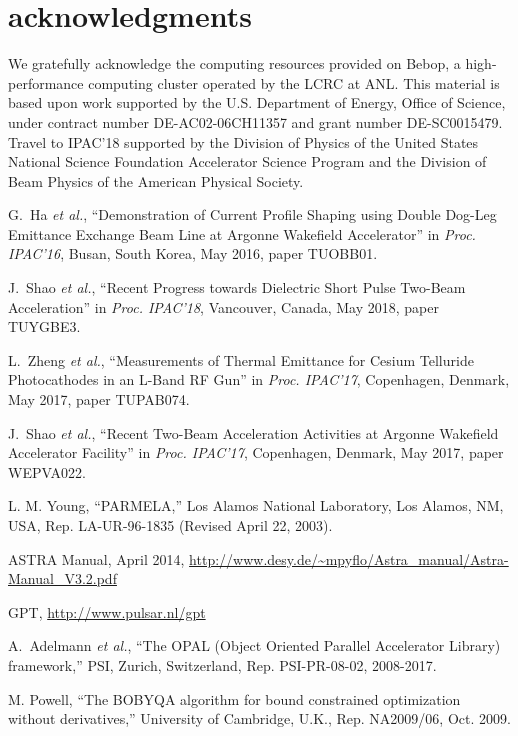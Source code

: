 \documentclass[letterpaper,  %
              ]{jacow-2_3}   %
\begin{document}
\section{acknowledgments}
We gratefully acknowledge the computing resources
provided on Bebop, a high-performance computing cluster
operated by the LCRC at ANL.
This material is based upon work supported by the 
U.S. Department of Energy, Office of Science, under 
contract number DE-AC02-06CH11357 and grant number DE-SC0015479. 
Travel to IPAC'18 supported by the Division of Physics 
of the United States National Science Foundation 
Accelerator Science Program and the Division of 
Beam Physics of the American Physical Society.

\begin{thebibliography}{99}
G.~Ha \emph{et al.}, “Demonstration of Current Profile 
Shaping using Double Dog-Leg Emittance Exchange Beam 
Line at Argonne Wakefield Accelerator”
in \textit{Proc. IPAC’16}, 
Busan, South Korea, May 2016, 
paper TUOBB01.

J.~Shao \emph{et al.}, “Recent Progress towards Dielectric Short Pulse Two-Beam Acceleration”
in \textit{Proc. IPAC’18}, 
Vancouver, Canada, May 2018, 
paper TUYGBE3.

L.~Zheng \emph{et al.}, “Measurements of Thermal Emittance 
for Cesium Telluride Photocathodes in an L-Band RF Gun”
in \textit{Proc. IPAC’17}, 
Copenhagen, Denmark, May 2017, 
paper TUPAB074.

J.~Shao \emph{et al.}, “Recent Two-Beam 
Acceleration Activities at Argonne Wakefield Accelerator Facility”
in \textit{Proc. IPAC’17}, 
Copenhagen, Denmark, May 2017, 
paper WEPVA022.

L. M. Young, “PARMELA,”
Los Alamos National Laboratory, 
Los Alamos, NM, USA,
Rep. LA-UR-96-1835 (Revised April 22, 2003).

ASTRA Manual, April 2014, 
\url{http://www.desy.de/~mpyflo/Astra_manual/Astra-Manual_V3.2.pdf}

GPT,  \url{http://www.pulsar.nl/gpt}

A.~Adelmann \emph{et al.},
“The OPAL (Object Oriented Parallel Accelerator Library) framework,”
PSI, Zurich, Switzerland,
Rep. PSI-PR-08-02, 2008-2017.

M. Powell, “The BOBYQA algorithm for bound constrained
optimization without derivatives,” University of Cambridge,
U.K., Rep. NA2009/06, Oct. 2009.


\end{thebibliography}
\end{document}
